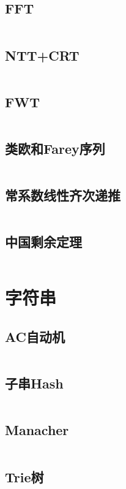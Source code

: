 \documentclass[UTF8]{ctexart}
\begin{document}
\subsection{FFT}
\inputminted{cpp}{math/FFT.cpp}

\subsection{NTT+CRT}
\inputminted{cpp}{math/NTT+CRT.cpp}

\subsection{FWT}
\inputminted{cpp}{math/FWT.cpp}

\subsection{类欧和Farey序列}
\inputminted{cpp}{math/类欧和Farey序列.cpp}

\subsection{常系数线性齐次递推}
\inputminted{cpp}{math/常系数线性齐次递推.cpp}

\subsection{中国剩余定理}
\inputminted{cpp}{math/中国剩余定理.cpp}

\section{字符串}

\subsection{AC自动机}
\inputminted{cpp}{string/AC自动机.cpp}

\subsection{子串Hash}
\inputminted{cpp}{string/Hash.cpp}

\subsection{Manacher}
\inputminted{cpp}{string/Manacher回文串.cpp}

\subsection{Trie树}
\inputminted{cpp}{string/Trie树.cpp}
\end{document}
